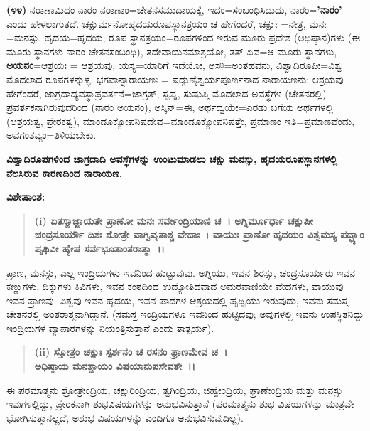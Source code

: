 \textbf{(೪೪)} ನರಾಣಾಮಿದಂ ನಾರಂ-ನರಾಣಾಂ=ಚೇತನಸಮುದಾಯಕ್ಕೆ, ಇದಂ=ಸಂಬಂಧಿ\-ಸಿದುದು, ನಾರಂ=\textbf{'ನಾರಂ'} ಎಂದು ಹೇಳಲಾಗುತದೆ. ಚಕ್ಷುರ್ಮನೋಹೃದಯರೂಪಸ್ಥಾನ\-ತ್ರಯಂ ಚ ಹೇಗೆಂದರೆ, ಚಕ್ಷುಃ =ನೇತ್ರ, ಮನಃ =ಮನಸ್ಸು, ಹೃದಯ=ಹೃದಯ, ರೂಪ ಸ್ಥಾನತ್ರಯಂ=ರೂಪಗಳಿಂದ ಇರುವ ಮೂರು ಪ್ರದೇಶ (ಅಧಿಷ್ಠಾನ)ಗಳು (ಈ ಮೂರು ಸ್ಥಾನಗಳು ನಾರಂ-ಚೇತನಸಂಬಂಧಿ), ತದೇವಾಯನಮಾಶ್ರಯೋ, ತತ್ ಏವ=ಆ ಮೂರು ಸ್ಥಾನಗಳು, \textbf{ಅಯನಂ}=ಆಶ್ರಯಃ = ಆಶ್ರಯವು, ಯಸ್ಯ=ಯಾರಿಗೆ ಇದೆಯೋ, ಅಸೌ=ಅಂತಹವನು, ವಿಶ್ವಾದಿರೂಪೀ=ವಿಶ್ವ ಮೊದಲಾದ ರೂಪಗಳನ್ನುಳ್ಳ, ಭಗವಾನ್ನಾ\-ರಾಯಣಃ = ಷಡ್ಗುಣೈಶ್ವರ್ಯಪೂರ್ಣನಾದ ನಾರಾಯಣನು; ಆಶ್ರಯವು ಹೇಗೆಂದರೆ, ಜಾಗ್ರದಾದ್ಯವಸ್ಥಾಪ್ರವರ್ತನೆ=\-ಜಾಗ್ರತ್, ಸ್ವಪ್ನ, ಸುಷುಪ್ತಿ ಮೊದಲಾದ ಅವಸ್ಥೆಗಳ (ಚೇತನರಲ್ಲಿ) ಪ್ರವರ್ತಕನಾಗಿರುವುದರಿಂದ (ನಾರಂ ಅಯನಂ), ಅಸ್ಕಿನ್=ಈ, ಅರ್ಥದ್ವಯೇ=ಎರಡು ಬಗೆಯ ಅರ್ಥಗಳಲ್ಲಿ (ಆಶ್ರಯತ್ವ, ಪ್ರೇರಕತ್ವ), ಮಾಂಡೂಕ್ಯೋಪನಿಷದೇವ=ಮಾಂಡೂಕ್ಯೋಪನಿಷತ್ತೇ, ಪ್ರಮಾಣಂ ಇತಿ=ಪ್ರಮಾಣವೆಂದು, ಅವಗಂತವ್ಯಂ=ತಿಳಿಯಬೇಕು.

\begin{center}
\textbf{ವಿಶ್ವಾದಿರೂಪಗಳಿಂದ ಜಾಗ್ರದಾದಿ ಅವಸ್ಥೆಗಳನ್ನು ಉಂಟುಮಾಡಲು ಚಕ್ಷು ಮನಸ್ಸು, ಹೃದಯರೂಪಸ್ಥಾನಗಳಲ್ಲಿ ನೆಲಸಿರುವ ಕಾರಣದಿಂದ ನಾರಾಯಣ.}
\end{center}

\noindent
\textbf{ವಿಶೇಷಾಂಶ:\enginline{-}}

\begin{verse}
\textbf{(i) ಏತಸ್ಮಾಜ್ಜಾಯತೇ ಪ್ರಾಣೋ ಮನಃ ಸರ್ವೇಂದ್ರಿಯಾಣಿ ಚ~। ಅಗ್ನಿರ್ಮೂರ್ಧಾ ಚಕ್ಷುಷೀ ಚಂದ್ರಸೂರ್ಯೌ ದಿಶಃ ಶೋತ್ರೇ ವಾಗ್ವಿವೃತಾಶ್ಚ ವೇದಾಃ~। ವಾಯುಃ ಪ್ರಾಣೋ ಹೃದಯಂ ವಿಶ್ವಮಸ್ಯ ಪದ್ಭ್ಯಾಂ ಪೃಥಿವೀ ಹ್ಯೇಷ ಸರ್ವಭೂತಾಂತರಾತ್ಮಾ~।।}
\end{verse}


ಪ್ರಾಣ, ಮನಸ್ಸು, ಎಲ್ಲ ಇಂದ್ರಿಯಗಳು ಇವನಿಂದ ಹುಟ್ಟುವುವು. ಅಗ್ನಿಯು, ಇವನ ಶಿರಸ್ಸು, ಚಂದ್ರಸೂರ್ಯರು ಇವನ ಕಣ್ಣುಗಳು, ದಿಕ್ಕುಗಳು ಕಿವಿಗಳು, ಇವನ ಕಂಠದಿಂದ ಉದ್ಯೋತಿದವಾದ ಅಮರವಾಣಿಯೇ ವೇದಗಳು, ವಾಯುವು ಇವನ ಪ್ರಾಣವು. ವಿಶ್ವವು ಇವನ ಹೃದಯ, ಇವನ ಪಾದಗಳ ಆಶ್ರಯದಲ್ಲಿ ಪೃಥ್ವಿಯು ಇರುವುದು, ಇವನು ಸಮಸ್ತ ಚೇತನರಲ್ಲಿ ಅಂತರಾತ್ಮನಾಗಿದ್ದಾನೆ. (ಸಮಸ್ತ ಇಂದ್ರಿಯಗಳೂ ಇವನಿಂದ ಹುಟ್ಟಿದವು; ಅವುಗಳಲ್ಲಿ ಇವನು ಉಪಸ್ಥಿತನಿದ್ದು ಇಂದ್ರಿಯಗಳ ವ್ಯಾಪಾರಗಳನ್ನು ನಿಯಂತ್ರಿಸುತ್ತಾನೆ ಎಂದು ತಾತ್ಪರ್ಯ).

\begin{verse}
\textbf{(ii) ಸ್ತೋತ್ರಂ ಚಕ್ಷುಃ ಸ್ಪರ್ಶನಂ ಚ ರಸನಂ ಫ್ರಾಣಮೇವ ಚ~।}\\\textbf{ಅಧಿಷ್ಠಾಯ ಮನಶ್ಚಾಯಂ ವಿಷಯಾನುಪಸೇವತೇ~।।}
\end{verse}


ಈ ಪರಮಾತ್ಮನು ಶ್ರೋತ್ರೇಂದ್ರಿಯ, ಚಕ್ಷುರಿಂದ್ರಿಯ, ತ್ವಗಿಂದ್ರಿಯ, ಜಿಹ್ವೇಂದ್ರಿಯ, ಘ್ರಾಣೇಂದ್ರಿಯ ಮತ್ತು ಮನಸ್ಸು ಇವುಗಳಲ್ಲಿದ್ದು, ಪ್ರೇರಕನಾಗಿ ಶುಭವಿಷಯಗಳನ್ನು ಅನುಭವಿಸುತ್ತಾನೆ (ಪರಮಾತ್ಮನು ಶುಭ ವಿಷಯಗಳನ್ನು ಮಾತ್ರವೇ ಭೋಗಿಸುತ್ತಾನಲ್ಲದೆ, ಅಶುಭ ವಿಷಯಗಳನ್ನು ಎಂದಿಗೂ ಅನುಭವಿಸುವುದಿಲ್ಲ).

